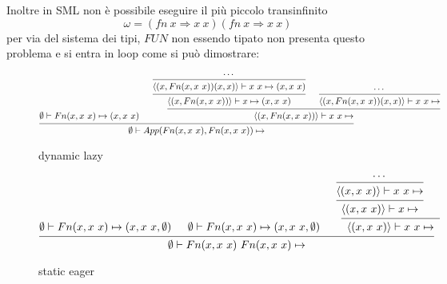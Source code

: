 \documentclass[a4paper]{article}
\begin{document}
	Inoltre in SML non è possibile eseguire il più piccolo transinfinito 
	\[ \omega = (fn \ x \Rightarrow x \ x)(fn \ x \Rightarrow x \ x) \]
	per via del sistema dei tipi, $FUN$ non essendo tipato non presenta questo problema e si entra in loop come si può dimostrare:
	
	\begin{figure}[ht]
	\[
		\begin{prooftree}
	
			\hypo{\emptyset \vdash Fn(x, x \ x) \mapsto (x, x \ x) }
			\hypo{\cdots}
			\infer1[]{\langle (x, Fn(x, x \ x))(x,x)\rangle \vdash x \ x \mapsto (x, x \ x)}
			\infer1[]{\langle(x, Fn(x, x \ x))\rangle \vdash x \mapsto (x, x \ x)}
			\hypo{\cdots}
			\infer1[]{\langle (x, Fn(x, x \ x))(x,x)\rangle \vdash x \ x \mapsto }
			\infer2[]{\langle (x, Fn(x, x \ x))\rangle \vdash x \ x \mapsto }
			\infer2[]{\emptyset \vdash App(Fn(x, x \ x),  Fn(x, x \ x)) \mapsto } 
		\end{prooftree}
	\]
	\caption{dynamic lazy}
	\end{figure}
	
	\begin{figure}[ht]
	\[
		\begin{prooftree}
			\hypo{\emptyset \vdash Fn(x, x \ x) \mapsto (x, x \ x, \emptyset)}

			\hypo{\emptyset \vdash Fn(x, x \ x) \mapsto (x, x \ x, \emptyset)}

			\hypo{\cdots}
			\infer1[]{\langle (x, x \ x) \rangle \vdash x \ x \mapsto}
			\infer1[]{\langle (x, x \ x) \rangle \vdash x \mapsto}
			\hypo{}
			\infer2[]{\langle (x, x \ x) \rangle \vdash x \ x \mapsto }

			\infer3[]{\emptyset \vdash Fn(x, x \ x)\ Fn(x, x \ x) \mapsto }

		\end{prooftree}
	\]
	\caption{static eager}
	\end{figure}
\end{document}
